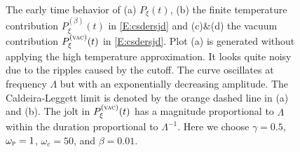 \documentclass[11pt,a4paper]{article}
\begin{document}
\begin{figure}
\centering
    \scalebox{0.45}{\texttt{[image: CL]}}
    \caption{The early time behavior of (a) $P_{\xi}(t)$, (b) the finite temperature contribution $P_{\xi}^{(\beta)}(t)$ in \eqref{E:csdersjd} and (c)\&(d) the vacuum contribution $P_{\xi}^{(\textsc{vac})}(t)$ in \eqref{E:csdersjd}. Plot (a) is generated without applying the high temperature approximation. It looks quite noisy due to the ripples caused by the cutoff. The curve oscillates at frequency $\Lambda$ but with an exponentially decreasing amplitude. The Caldeira-Leggett limit is denoted by the orange dashed line in (a) and (b). The jolt in $P_{\xi}^{(\textsc{vac})}(t)$ has a magnitude proportional to $\Lambda$ within the duration proportional to $\Lambda^{-1}$. Here we choose $\gamma=0.5$, $\omega_{\textsc{p}}=1$, $\omega_{c}=50$, and $\beta=0.01$.}\label{Fi:CL}
\end{figure}
\end{document}
